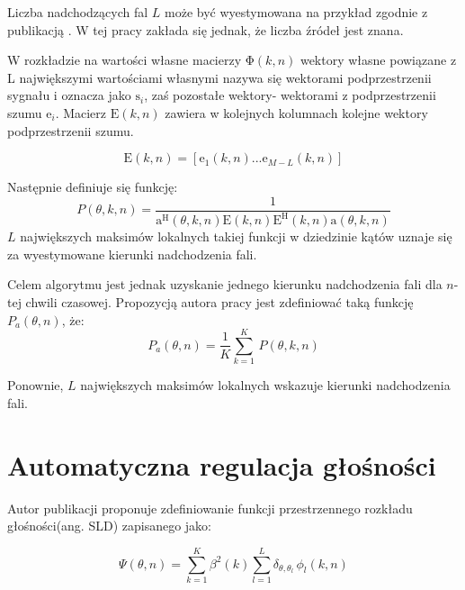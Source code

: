 \noindent Liczba nadchodzących fal $L$ może być wyestymowana na przykład zgodnie z publikacją \cite{n_src}. W tej pracy zakłada się jednak, że liczba źródeł jest znana.

\noindent W rozkładzie na wartości własne macierzy $\bm{\mathrm{\Phi}}(k,n)$ wektory własne powiązane z L największymi wartościami własnymi nazywa się wektorami podprzestrzenii sygnału i oznacza jako $\bm{\mathrm{s}}_{i}$, zaś pozostałe wektory- wektorami z podprzestrzenii szumu $\bm{\mathrm{e}}_{i}$. Macierz $\bm{\mathrm{E}}(k,n)$ zawiera w kolejnych kolumnach kolejne wektory podprzestrzenii szumu.

\begin{equation}
    \label{equation:eigenvectors}
    \bm{\mathrm{E}}(k,n)=
    [\bm{\mathrm{e}}_{1}(k,n)...
    \bm{\mathrm{e}}_{M-L}(k,n)]
\end{equation}

\noindent Następnie definiuje się funkcję:
\begin{equation}
    \label{equation:P}
    P(\theta,k,n)=
    \dfrac{1}{
    \bm{\mathrm{a}}^{\mathrm{H}}(\theta,k,n)
    \bm{\mathrm{E}}(k,n)
    \bm{\mathrm{E}}^{\mathrm{H}}(k,n)
    \bm{\mathrm{a}}(\theta,k,n)
    }
\end{equation}
\noindent 
$L$ największych maksimów lokalnych takiej funkcji w dziedzinie kątów uznaje się za wyestymowane kierunki nadchodzenia fali.

\noindent Celem algorytmu jest jednak uzyskanie jednego kierunku nadchodzenia fali dla $n$-tej chwili czasowej. Propozycją autora pracy jest zdefiniować taką funkcję $P_{a}(\theta,n)$, że:
\begin{equation}
    \label{equation:Pa}
    P_{a}(\theta,n) = 
    \dfrac{1}{K}\sum_{k=1}^{K}\,P(\theta,k,n)   
\end{equation}

\noindent Ponownie, $L$ największych maksimów lokalnych wskazuje kierunki nadchodzenia fali.

\newpage
\section{Automatyczna regulacja głośności}

Autor publikacji \cite{Braun2014} proponuje zdefiniowanie funkcji przestrzennego rozkładu głośności(ang. SLD) zapisanego jako:

\begin{equation}
    \label{equation:SLD}
    \Psi(\theta,n)=
    \sum_{k=1}^{K} \beta^{2}(k)
    \sum_{l=1}^{L}\delta_{\theta,\theta_{l}}
    \, \phi_{l}(k,n)
\end{equation}

